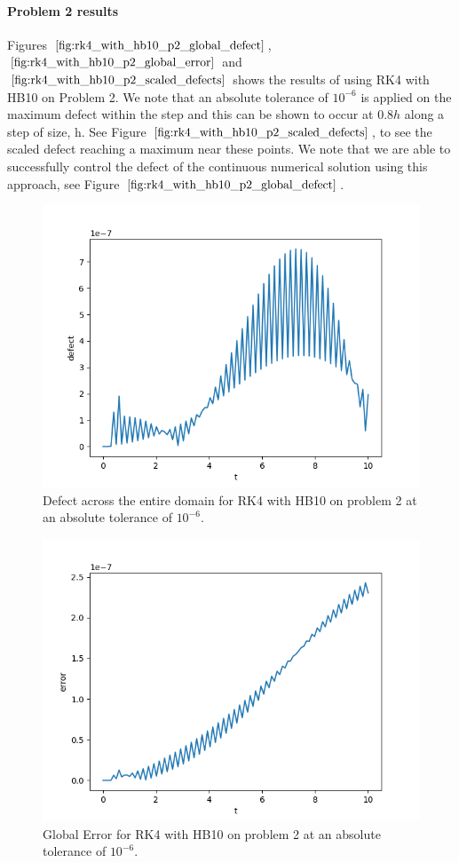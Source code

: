 \paragraph{Problem 2 results}
Figures $\ref{fig:rk4_with_hb10_p2_global_defect}$, $\ref{fig:rk4_with_hb10_p2_global_error}$ and $\ref{fig:rk4_with_hb10_p2_scaled_defects}$ shows the results of using RK4 with HB10 on Problem 2. We note that an absolute tolerance of $10^{-6}$ is applied on the maximum defect within the step and this can be shown to occur at $0.8h$ along a step of size, h. See Figure $\ref{fig:rk4_with_hb10_p2_scaled_defects}$, to see the scaled defect reaching a maximum near these points. We note that we are able to successfully control the defect of the continuous numerical solution using this approach, see Figure $\ref{fig:rk4_with_hb10_p2_global_defect}$. 

\begin{figure}[H]
\centering
\includegraphics[width=0.7\linewidth]{./figures/rk4_with_hb10_p2_global_defect}
\caption{Defect across the entire domain for RK4 with HB10 on problem 2 at an absolute tolerance of $10^{-6}$.}
\label{fig:rk4_with_hb10_p2_global_defect}
\end{figure}

\begin{figure}[H]
\centering
\includegraphics[width=0.7\linewidth]{./figures/rk4_with_hb10_p2_global_error}
\caption{Global Error for RK4 with HB10 on problem 2 at an absolute tolerance of $10^{-6}$.}
\label{fig:rk4_with_hb10_p2_global_error}
\end{figure}


